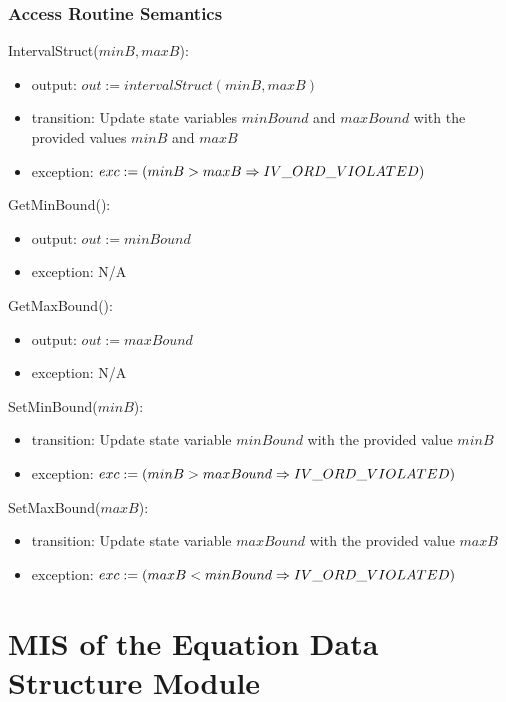 \documentclass[12pt, titlepage]{article}
\begin{document}
\subsubsection{Access Routine Semantics}

\noindent IntervalStruct($minB, maxB$):
\begin{itemize}
	\item output: $out := intervalStruct(minB, maxB)$
	\item transition: Update state variables $minBound$ and $maxBound$ with the 
	provided values $minB$ and $maxB$
	\item exception: $exc := \\
	(minB > maxB \Rightarrow IV\_ORD\_VIOLATED)$
\end{itemize}

\noindent GetMinBound():
\begin{itemize}
	\item output: $out := minBound$
	\item exception: N/A
\end{itemize}

\noindent GetMaxBound():
\begin{itemize}
	\item output: $out := maxBound$
	\item exception: N/A
\end{itemize}

\noindent SetMinBound($minB$):
\begin{itemize}
	\item transition: Update state variable $minBound$ with the provided value 
	$minB$
	\item exception: $exc := \\
	(minB > maxBound \Rightarrow IV\_ORD\_VIOLATED)$
\end{itemize}

\noindent SetMaxBound($maxB$):
\begin{itemize}
	\item transition: Update state variable $maxBound$ with the provided value 
	$maxB$
	\item exception: $exc := \\
	(maxB < minBound \Rightarrow IV\_ORD\_VIOLATED)$
\end{itemize}

\newpage

\section{MIS of the Equation Data Structure Module} 
\label{Module_equationdatastructure}
\end{document}
